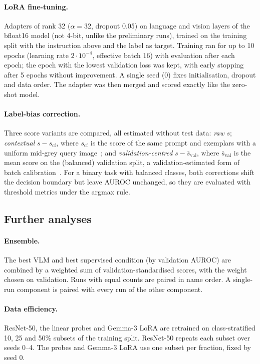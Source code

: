 \documentclass[11pt]{article}
\begin{document}
\paragraph{LoRA fine-tuning.} Adapters of rank 32 ($\alpha=32$, dropout 0.05) on language and
vision layers of the bfloat16 model (not 4-bit, unlike the preliminary runs), trained on the
training split with the instruction above and the label as target. Training ran for up to
10 epochs (learning rate $2\cdot10^{-4}$, effective batch 16) with evaluation after each epoch;
the epoch with the lowest validation loss was kept, with early stopping after 5 epochs without
improvement. A single seed (0) fixes initialisation, dropout and data order. The adapter was
then merged and scored exactly like the zero-shot model.

\paragraph{Label-bias correction.} Three score variants are compared, all estimated without
test data: \emph{raw} $s$; \emph{contextual} $s-s_{\mathrm{cf}}$, where $s_{\mathrm{cf}}$ is the
score of the same prompt and exemplars with a uniform mid-grey query
image~\citep{zhao2021calibrate}; and \emph{validation-centred} $s-\bar{s}_{\mathrm{val}}$, where
$\bar{s}_{\mathrm{val}}$ is the mean score on the (balanced) validation split, a
validation-estimated form of batch calibration~\citep{zhou2024batch}. For a binary task with
balanced classes, both corrections shift the decision boundary but leave AUROC unchanged, so
they are evaluated with threshold metrics under the argmax rule.

\subsection{Further analyses}

\paragraph{Ensemble.} The best VLM and best supervised condition (by validation AUROC) are
combined by a weighted sum of validation-standardised scores, with the weight chosen on
validation. Runs with equal counts are paired in name order. A single-run component is paired
with every run of the other component.

\paragraph{Data efficiency.} ResNet-50, the linear probes and Gemma-3 LoRA are retrained on
class-stratified 10, 25 and 50\% subsets of the training split. ResNet-50 repeats each subset
over seeds 0--4. The probes and Gemma-3 LoRA use one subset per fraction, fixed by seed 0.
\end{document}

